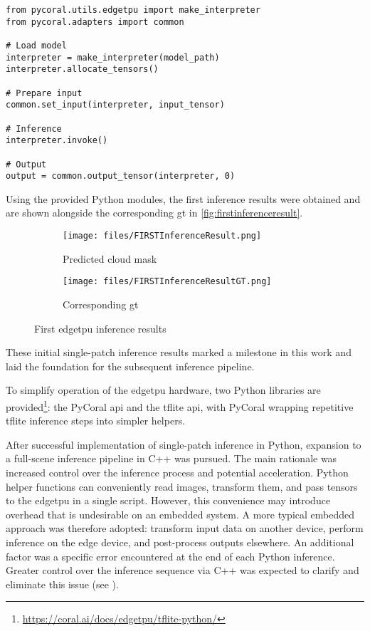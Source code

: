 {\begin{verbatim}
from pycoral.utils.edgetpu import make_interpreter
from pycoral.adapters import common

# Load model
interpreter = make_interpreter(model_path)
interpreter.allocate_tensors()

# Prepare input
common.set_input(interpreter, input_tensor)

# Inference
interpreter.invoke()

# Output
output = common.output_tensor(interpreter, 0)
\end{verbatim}

Using the provided Python modules, the first inference results were obtained and are shown alongside the corresponding \gls{gt} in \autoref{fig:firstinferenceresult}.

\begin{figure}[htbp]
    \centering
    \begin{subfigure}{0.45\textwidth}
        \centering
        \texttt{[image: files/FIRSTInferenceResult.png]}
        \caption{Predicted cloud mask}
    \end{subfigure}
    \hfill
    \begin{subfigure}{0.45\textwidth}
        \centering
        \texttt{[image: files/FIRSTInferenceResultGT.png]}
        \caption{Corresponding \gls{gt}}
    \end{subfigure}
    \caption{First \gls{edgetpu} inference results}
    \label{fig:firstinferenceresult}
\end{figure}

These initial single-patch inference results marked a milestone in this work and laid the foundation for the subsequent inference pipeline.

To simplify operation of the \gls{edgetpu} hardware, two Python libraries are provided\footnote{\url{https://coral.ai/docs/edgetpu/tflite-python/}}:
the PyCoral \gls{api} and the \gls{tflite} \gls{api}, with PyCoral wrapping repetitive \gls{tflite} inference steps into simpler helpers.

After successful implementation of single-patch inference in Python, expansion to a full-scene inference pipeline in C++ was pursued.
The main rationale was increased control over the inference process and potential acceleration.
Python helper functions can conveniently read  images, transform them, and pass tensors to the \gls{edgetpu} in a single script.
However, this convenience may introduce overhead that is undesirable on an embedded system.
A more typical embedded approach was therefore adopted: transform input data on another device, perform inference on the edge device, and post-process outputs elsewhere.
An additional factor was a specific error encountered at the end of each Python inference.
Greater control over the inference sequence via C++ was expected to clarify and eliminate this issue (see ).

}
